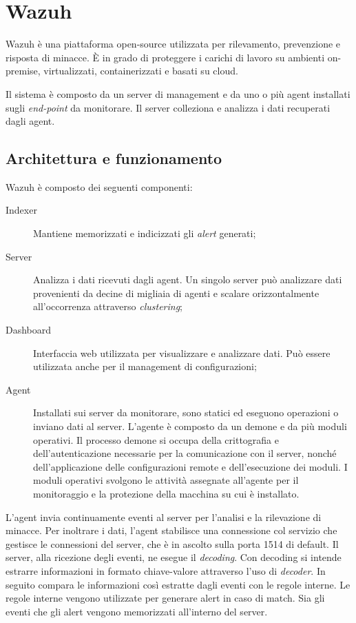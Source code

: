 \section{Wazuh}

Wazuh \cite{wazuh} è una piattaforma open-source utilizzata per rilevamento, prevenzione e risposta di minacce. È in grado di proteggere i carichi di lavoro su ambienti on-premise, virtualizzati, containerizzati e basati su cloud.

Il sistema è composto da un server di management e da uno o più agent installati sugli \textit{end-point} da monitorare. Il server colleziona e analizza i dati recuperati dagli agent.

\subsection{Architettura e funzionamento}
Wazuh è composto dei seguenti componenti:
\begin{description}
    \item [Indexer] Mantiene memorizzati e indicizzati gli \textit{alert} generati;
    \item [Server] Analizza i dati ricevuti dagli agent. Un singolo server può analizzare dati provenienti da decine di migliaia di agenti e scalare orizzontalmente all'occorrenza attraverso \textit{clustering};
    \item [Dashboard] Interfaccia web utilizzata per visualizzare e analizzare dati.  Può essere utilizzata anche per il management di configurazioni;
    \item [Agent] Installati sui server da monitorare, sono statici ed eseguono operazioni o inviano dati  al server.
    L'agente è composto da un demone e da più moduli operativi. Il processo demone si occupa della crittografia e dell'autenticazione necessarie per la comunicazione con il server, nonché dell'applicazione delle configurazioni remote e dell'esecuzione dei moduli. I moduli operativi svolgono le attività assegnate all'agente per il monitoraggio e la protezione della macchina su cui è installato.
\end{description}

L'agent invia continuamente eventi al server per l'analisi e la rilevazione di minacce. Per inoltrare i dati, l'agent stabilisce una connessione col servizio che gestisce le connessioni del server, che è in ascolto sulla porta 1514 di default.  Il server, alla ricezione degli eventi, ne esegue il \textit{decoding}. Con decoding si intende estrarre informazioni in formato  chiave-valore attraverso l'uso di \textit{decoder}. In seguito compara le informazioni così estratte dagli eventi con le regole interne. Le regole interne vengono utilizzate per generare alert in caso di match.
Sia gli eventi che gli alert vengono memorizzati all'interno del server.

